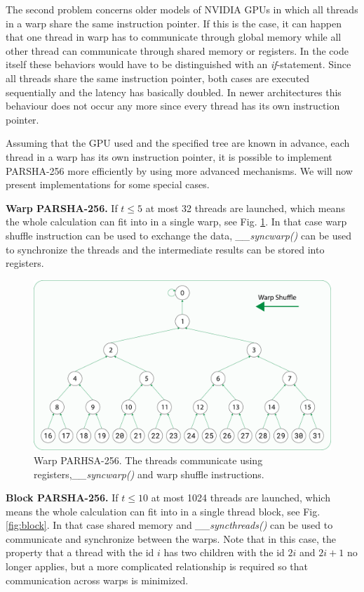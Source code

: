 \documentclass[letterpaper]{article}
\newcommand{\mypar}[1]{{\bf #1.}}
\begin{document}
The second problem concerns older models of NVIDIA GPUs in which all threads in a warp share the same instruction pointer. If this is the case, it can happen that one thread in warp has to communicate through global memory while all other thread can communicate through shared memory or registers.
In the code itself these behaviors would have to be distinguished with an \emph{if}-statement. Since all threads share the same instruction pointer, both cases are executed sequentially and the latency has basically doubled. In newer architectures this behaviour does not occur any more since every thread has its own instruction pointer.

Assuming that the GPU used and the specified tree are known in advance, each thread in a warp has its own instruction pointer, it is possible to implement PARSHA-256 more efficiently by using more advanced mechanisms. We will now present implementations for some special cases.

\mypar{Warp PARSHA-256} If $t \leq 5$ at most 32 threads are launched, which means the whole calculation can fit into in a single warp, see Fig. \ref{fig:warp}. In that case warp shuffle instruction can be used to exchange the data, \emph{\_\_syncwarp()} can be used to synchronize the threads and the intermediate results can be stored into registers.

\begin{figure}[t]\centering
\includegraphics[scale=0.15]{warp2.pdf}
  \caption{Warp PARHSA-256. The threads communicate using registers,\emph{\_\_syncwarp()} and warp shuffle instructions. \label{fig:warp}}
\end{figure}


\mypar{Block PARSHA-256} If $t \leq 10$ at most 1024 threads are launched, which means the whole calculation can fit into in a single thread block, see Fig. \ref{fig:block}. In that case shared memory and \emph{\_\_syncthreads()} can be used to communicate and synchronize between the warps. Note that in this case, the property that a thread with the id $i$ has two children with the id $2i$ and $2i+1$ no longer applies, but a more complicated relationship is required so that communication across warps is minimized.
\end{document}
